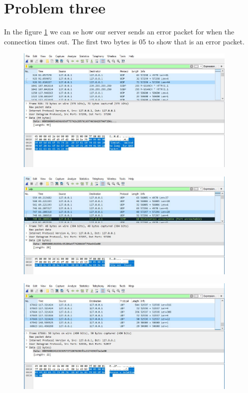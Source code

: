 \documentclass[a4paper,12pt]{article}
\numberwithin{figure}{section}
\begin{document}
\newpage

\section{Problem three}

In the figure \ref{error 0} we can se how our server sends an error packet for when the connection times out. The first two bytes is 05 to show that is an error packet. 
\begin{figure}[h!]
	\centering
	\includegraphics[width=0.95\textwidth,keepaspectratio]{img/error0.jpg} 
	\caption{}
	\label{error 0}
\end{figure}

\begin{figure}[h!]
	\centering
	\includegraphics[width=0.95\textwidth,keepaspectratio]{img/error1.jpg} 
	\caption{}
	\label{error 1}
\end{figure}

\begin{figure}[h!]
	\centering
	\includegraphics[width=0.95\textwidth,keepaspectratio]{img/error2.jpg} 
	\caption{}
	\label{error 2}
\end{figure}
\end{document}
